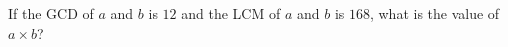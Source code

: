 If the GCD of $a$ and $b$ is $12$ and the LCM of $a$ and $b$ is $168$, what is the value of $a\times b$?